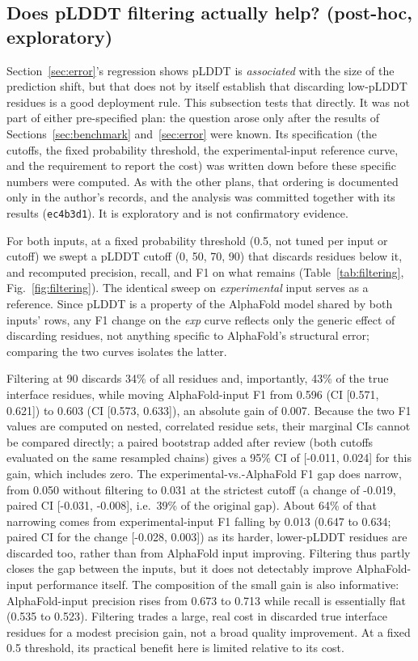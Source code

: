 \documentclass[10pt]{article}
\begin{document}
\subsection{Does pLDDT filtering actually help? (post-hoc, exploratory)}
\label{sec:filtering}

Section~\ref{sec:error}'s regression shows pLDDT is \emph{associated} with
the size of the prediction shift, but that does not by itself establish that
discarding low-pLDDT residues is a good deployment rule. This subsection
tests that directly. It was not part of either pre-specified plan: the
question arose only after the results of Sections~\ref{sec:benchmark}
and~\ref{sec:error} were known. Its specification (the cutoffs, the fixed
probability threshold, the experimental-input reference curve, and the
requirement to report the cost) was written down before these specific
numbers were computed. As with the other plans, that ordering is documented
only in the author's records, and the analysis was committed together with
its results (\texttt{ec4b3d1}). It is exploratory and is not confirmatory
evidence.

For both inputs, at a fixed probability threshold (0.5,
not tuned per input or cutoff) we swept a pLDDT cutoff
(0, 50, 70, 90) that discards
residues below it, and recomputed precision, recall, and F1 on what
remains (Table~\ref{tab:filtering}, Fig.~\ref{fig:filtering}). The
identical sweep on \emph{experimental} input serves as a reference. Since
pLDDT is a property of the AlphaFold model shared by both inputs' rows, any
F1 change on the \emph{exp} curve reflects only the generic effect of
discarding residues, not anything specific to AlphaFold's structural
error; comparing the two curves isolates the latter.

Filtering at 90 discards 34\%
of all residues and, importantly, 43\% of the
true interface residues, while moving AlphaFold-input F1 from
0.596 (CI [0.571, 0.621]) to 0.603 (CI
[0.573, 0.633]), an absolute gain of 0.007.
Because the two F1 values are computed on nested, correlated residue sets,
their marginal CIs cannot be compared directly; a paired bootstrap added after review
(both cutoffs evaluated on the same resampled chains) gives a 95\% CI of
[-0.011, 0.024] for this gain, which includes zero. The
experimental-vs.-AlphaFold F1 gap does narrow, from 0.050 without
filtering to 0.031 at the strictest cutoff (a change of
-0.019, paired CI [-0.031, -0.008], i.e.\
39\% of the original gap). About
64\% of that narrowing comes from experimental-input F1
falling by 0.013 (0.647 to
0.634; paired CI for the change [-0.028, 0.003]) as its
harder, lower-pLDDT residues are discarded too, rather than from AlphaFold
input improving. Filtering thus partly closes the gap between the inputs,
but it does not detectably improve AlphaFold-input performance itself. The
composition of the small gain is also informative: AlphaFold-input precision
rises from 0.673 to 0.713 while
recall is essentially flat (0.535 to
0.523). Filtering trades a large, real cost in discarded
true interface residues for a modest precision gain, not a broad quality
improvement. At a fixed 0.5 threshold, its practical
benefit here is limited relative to its cost.
\end{document}
